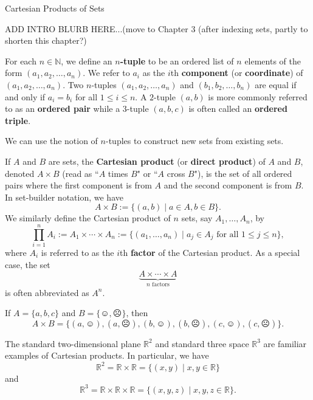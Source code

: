 \begin{section}{Cartesian Products of Sets}\label{sec:Cartesian Products}

ADD INTRO BLURB HERE...(move to Chapter 3 (after indexing sets, partly to shorten this chapter?)

\begin{definition}
For each $n\in \mathbb{N}$, we define an \textbf{$n$-tuple} to be an ordered list of $n$ elements of the form $(a_1, a_2,\ldots,a_n)$. We refer to $a_i$ as the $i$th \textbf{component} (or \textbf{coordinate}) of $(a_1, a_2,\ldots,a_n)$. Two $n$-tuples $(a_1, a_2,\ldots,a_n)$ and $(b_1, b_2,\ldots,b_n)$ are equal if and only if $a_i=b_i$ for all $1\leq i\leq n$. A $2$-tuple $(a,b)$ is more commonly referred to as an \textbf{ordered pair} while a $3$-tuple $(a,b,c)$ is often called an \textbf{ordered triple}.
\end{definition}

We can use the notion of $n$-tuples to construct new sets from existing sets.

\begin{definition}
If $A$ and $B$ are sets, the \textbf{Cartesian product} (or \textbf{direct product}) of $A$ and $B$, denoted $A\times B$ (read as ``$A$ times $B$" or ``$A$ cross $B$"), is the set of all ordered pairs where the first component is from $A$ and the second component is from $B$. In set-builder notation, we have
\[
A\times B:=\{(a,b)\mid a\in A, b\in B\}.
\]
We similarly define the Cartesian product of $n$ sets, say $A_1, \ldots, A_n$, by
\[
\prod_{i=1}^{n} A_i:=A_1\times \cdots \times A_n:=\{(a_1,\ldots,a_n)\mid  a_j\in A_j \mbox{ for all }1\leq j\leq n\},
\]
where $A_i$ is referred to as the $i$th \textbf{factor} of the Cartesian product. As a special case, the set 
\[
\underbrace{A\times \cdots \times A}_{n\text{ factors}}
\]
is often abbreviated as $A^n$.
\end{definition}

\begin{example}\label{ex:CartesianProduct}
If $A=\{a,b,c\}$ and $B=\{\smiley,\frownie\}$, then 
\[
A\times B=\{(a,\smiley), (a,\frownie),(b,\smiley),(b,\frownie), (c,\smiley),(c,\frownie)\}.
\]
\end{example}

\begin{example}
The standard two-dimensional plane $\mathbb{R}^2$ and standard three space $\mathbb{R}^{3}$ are familiar examples of Cartesian products.  In particular, we have
\[
\mathbb{R}^2=\mathbb{R}\times \mathbb{R}=\{(x,y)\mid x,y\in \mathbb{R}\}
\]
and
\[
\mathbb{R}^3=\mathbb{R}\times \mathbb{R}\times \mathbb{R}=\{(x,y,z)\mid x,y,z\in \mathbb{R}\}.
\]
\end{example}


\end{section}
